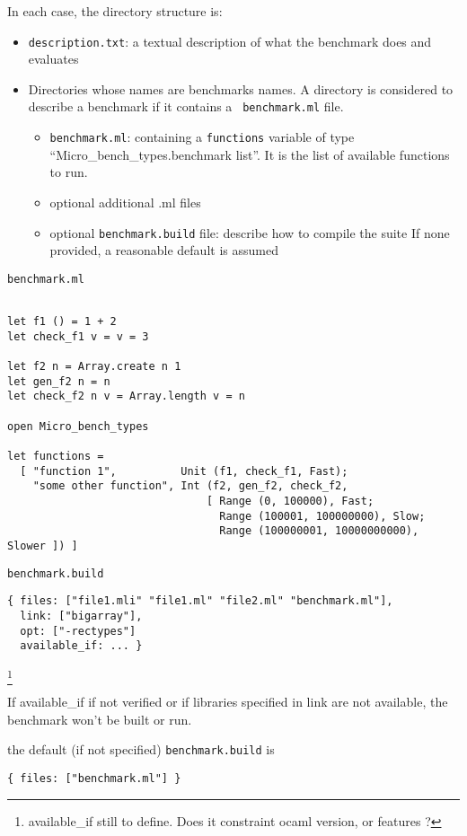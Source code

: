 \documentclass[11pt,a4paper]{article}
\begin{document}
In each case, the directory structure is:

\begin{itemize}
\item {\tt description.txt}: a textual description of what the benchmark does and evaluates
\item Directories whose names are benchmarks names. A directory is
  considered to describe a benchmark if it contains a {\tt
    benchmark.ml} file.
  \begin{itemize}
  \item {\tt benchmark.ml}: containing a {\tt functions} variable of
    type ``Micro\_bench\_types.benchmark list''. It is the list of
    available functions to run.
  \item optional additional .ml files
  \item optional {\tt benchmark.build} file: describe how to compile the
    suite If none provided, a reasonable default is assumed
  \end{itemize}
\end{itemize}

{\tt benchmark.ml}
\begin{verbatim}

let f1 () = 1 + 2
let check_f1 v = v = 3

let f2 n = Array.create n 1
let gen_f2 n = n
let check_f2 n v = Array.length v = n

open Micro_bench_types

let functions =
  [ "function 1",          Unit (f1, check_f1, Fast);
    "some other function", Int (f2, gen_f2, check_f2,
                               [ Range (0, 100000), Fast;
                                 Range (100001, 100000000), Slow;
                                 Range (100000001, 10000000000), Slower ]) ]

\end{verbatim}

{\tt benchmark.build}
\begin{verbatim}
{ files: ["file1.mli" "file1.ml" "file2.ml" "benchmark.ml"],
  link: ["bigarray"],
  opt: ["-rectypes"]
  available_if: ... }
\end{verbatim}
\footnote{available\_if still to define. Does it constraint ocaml version, or features ?}

If available\_if if not verified or if libraries specified in link are
not available, the benchmark won't be built or run.

the default (if not specified) {\tt benchmark.build} is
\begin{verbatim}
{ files: ["benchmark.ml"] }
\end{verbatim}
\end{document}
